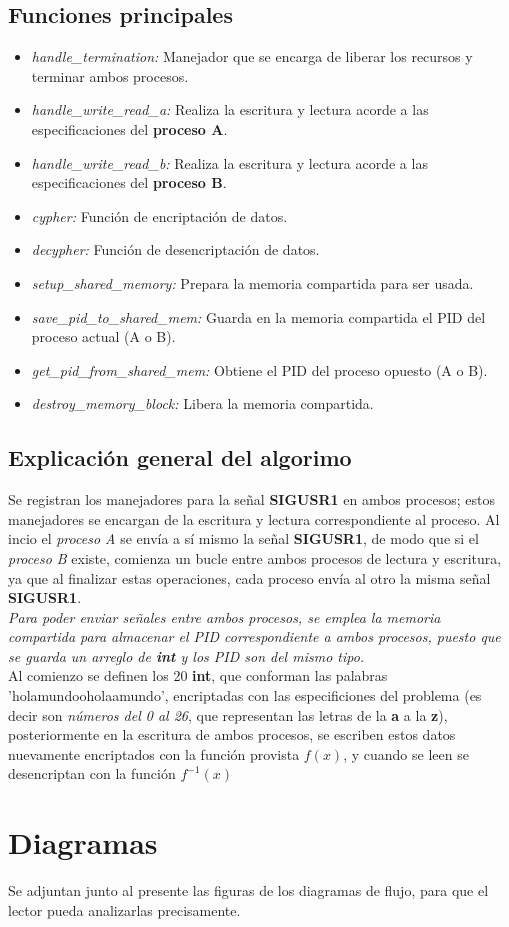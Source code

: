 \documentclass[letterpaper, 10 pt, conference]{ieeeconf}  %
\begin{document}
\subsection{Funciones principales}
\begin{itemize}
  \item \textit{handle\_termination:} Manejador que se encarga de liberar los recursos y terminar ambos procesos.
  \item \textit{handle\_write\_read\_a:} Realiza la escritura y lectura acorde a las especificaciones del \textbf{proceso A}.
  \item \textit{handle\_write\_read\_b:} Realiza la escritura y lectura acorde a las especificaciones del \textbf{proceso B}.
  \item \textit{cypher:} Función de encriptación de datos.
  \item \textit{decypher:} Función de desencriptación de datos.
  \item \textit{setup\_shared\_memory:} Prepara la memoria compartida para ser usada.
  \item \textit{save\_pid\_to\_shared\_mem:} Guarda en la memoria compartida el PID del proceso actual (A o B).
  \item \textit{get\_pid\_from\_shared\_mem:} Obtiene el PID del proceso opuesto (A o B).
  \item \textit{destroy\_memory\_block:} Libera la memoria compartida.
\end{itemize}

\subsection{Explicación general del algorimo}
Se registran los manejadores para la señal \textbf{SIGUSR1} en ambos procesos; estos manejadores se encargan de la escritura y lectura correspondiente al proceso. Al incio el \textit{proceso A} se envía a sí mismo la señal \textbf{SIGUSR1}, de modo que si el \textit{proceso B} existe, comienza un bucle entre ambos procesos de lectura y escritura, ya que al finalizar estas operaciones, cada proceso envía al otro la misma señal \textbf{SIGUSR1}. \\
\textit{Para poder enviar señales entre ambos procesos, se emplea la memoria compartida para almacenar el PID correspondiente a ambos procesos, puesto que se guarda un arreglo de \textbf{int} y los PID son del mismo tipo.} \\
Al comienzo se definen los 20 \textbf{int}, que conforman las palabras 'holamundooholaamundo', encriptadas con las especificiones del problema (es decir son \textit{números del 0 al 26}, que representan las letras de la \textbf{a} a la \textbf{z}), posteriormente en la escritura de ambos procesos, se escriben estos datos nuevamente encriptados con la función provista $f(x)$, y cuando se leen se desencriptan con la función $f^{-1}(x)$

\section{Diagramas}
Se adjuntan junto al presente las figuras de los diagramas de flujo, para que el lector pueda analizarlas precisamente.
\end{document}
